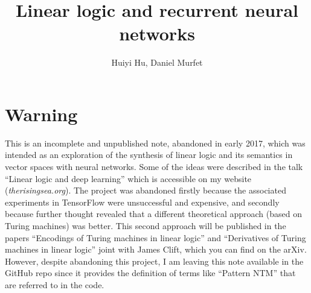 \documentclass[english,letter paper,12pt,leqno]{article}
\theoremstyle{example}
\numberwithin{equation}{section}
\def\res{\operatorname{Res}}
\begin{document}
\def\Res{\res\!}
\newcommand{\ud}{\mathrm{d}}
\newcommand{\Ress}[1]{\res_{#1}\!}
\newcommand{\cat}[1]{\mathcal{#1}}
\newcommand{\lto}{\longrightarrow}
\newcommand{\xlto}[1]{\stackrel{#1}\lto}
\newcommand{\mf}[1]{\mathfrak{#1}}
\newcommand{\md}[1]{\mathscr{#1}}
\def\sus{\l}
\def\l{\,|\,}
\def\sgn{\textup{sgn}}
\newcommand{\den}[1]{\llbracket #1 \rrbracket}
\def\inta{\textbf{int}}
\def\binta{\textbf{bint}}
\def\boola{\textbf{bool}}
\def\comp{\underline{\textup{comp}}}
\def\mult{\underline{\textup{mult}}}
\def\repeat{\underline{\textup{repeat}}}
\def\master{\underline{\textup{master}}}
\def\feed{\underline{\textup{feed}}}
\def\relu{\sigma}
\def\softmax{\sigma_{soft}}
\def\sigmoid{\sigma_{sigm}}

\DeclarePairedDelimiter\bra{\langle}{\rvert}
\DeclarePairedDelimiter\ket{\lvert}{\rangle}

\title{Linear logic and recurrent neural networks}
\author{Huiyi Hu, Daniel Murfet}

\maketitle

\tableofcontents

\section{Warning}


This is an incomplete and unpublished note, abandoned in early 2017, which was intended as an exploration of the synthesis of linear logic and its semantics in vector spaces with neural networks. Some of the ideas were described in the talk ``Linear logic and deep learning'' which is accessible on my website (\emph{therisingsea.org}). The project was abandoned firstly because the associated experiments in TensorFlow were unsuccessful and expensive, and secondly because further thought revealed that a different theoretical approach (based on Turing machines) was better. This second approach will be published in the papers ``Encodings of Turing machines in linear logic'' and ``Derivatives of Turing machines in linear logic'' joint with James Clift, which you can find on the arXiv. However, despite abandoning this project, I am leaving this note available in the GitHub repo since it provides the definition of terms like ``Pattern NTM'' that are referred to in the code.
\end{document}

